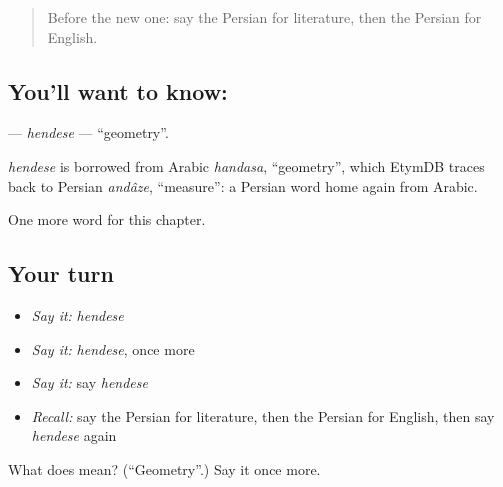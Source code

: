 \label{lesson:FA-C285-hendese}



\begin{quote}
Before the new one: say the Persian for literature, then the Persian for English.
\end{quote}

\subsection*{You'll want to know: }
\textbf{} — \emph{hendese} — \textquotedblleft{}geometry\textquotedblright{}.

\begin{cousinweb}
\emph{hendese} is borrowed from Arabic \emph{handasa}, \textquotedblleft{}geometry\textquotedblright{}, which EtymDB traces back to Persian \emph{andâze}, \textquotedblleft{}measure\textquotedblright{}: a Persian word home again from Arabic.
\end{cousinweb}

\begin{grammarlens}[title={What you've built}]
One more word for this chapter.
\end{grammarlens}

\subsection*{Your turn}
\begin{itemize}
\raggedright
  \item \emph{Say it:} \emph{hendese}
  \item \emph{Say it:} \emph{hendese}, once more
  \item \emph{Say it:} say \emph{hendese}
  \item \emph{Recall:} say the Persian for literature, then the Persian for English, then say \emph{hendese} again
\end{itemize}

\begin{tcolorbox}[breakable,colback=teal!4,colframe=teal!35!black,title={Before you move on}]
What does  mean? (\textquotedblleft{}Geometry\textquotedblright{}.) Say it once more.
\end{tcolorbox}
